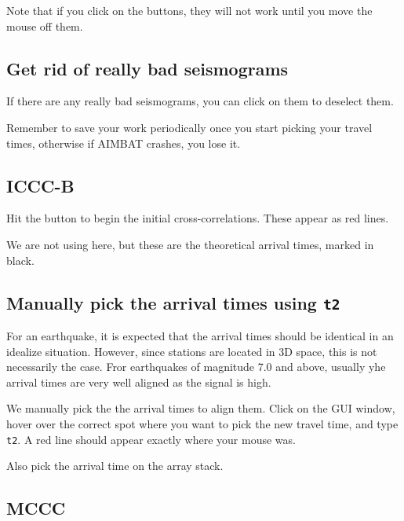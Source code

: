 \documentclass[letterpaper,10pt]{article}
\begin{document}
Note that if you click on the buttons, they will not work until you move the mouse off them.


\subsection{Get rid of really bad seismograms}

If there are any really bad seismograms, you can click on them to deselect them. 

Remember to save your work periodically once you start picking your travel times, otherwise if AIMBAT crashes, you lose it. 


\subsection{ICCC-B}

Hit the  button to begin the initial cross-correlations. These appear as red lines. 

We are not using  here, but these are the theoretical arrival times, marked in black. 


\subsection{Manually pick the arrival times using \texttt{t2}}

For an earthquake, it is expected that the arrival times should be identical in an idealize situation. However, since stations are located in 3D space, this is not necessarily the case. Fror earthquakes of magnitude 7.0 and above, usually yhe arrival times are very well aligned as the signal is high.

We manually pick the the arrival times to align them. Click on the GUI window, hover over the correct spot where you want to pick the new travel time, and type \texttt{t2}. A red line should appear exactly where your mouse was. 

Also pick the arrival time on the array stack. 


\subsection{MCCC}
\end{document}
